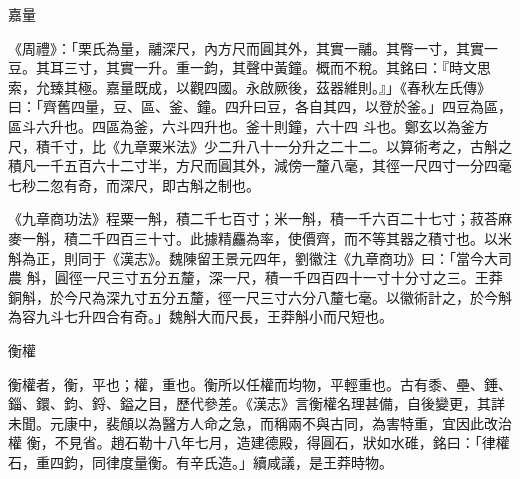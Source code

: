 \begin{pinyinscope}
 嘉量



 《周禮》：「栗氏為量，鬴深尺，內方尺而圓其外，其實一鬴。其臀一寸，其實一豆。其耳三寸，其實一升。重一鈞，其聲中黃鐘。概而不稅。其銘曰：『時文思索，允臻其極。嘉量既成，以觀四國。永啟厥後，茲器維則。』」《春秋左氏傳》曰：「齊舊四量，豆、區、釜、鐘。四升曰豆，各自其四，以登於釜。」四豆為區，區斗六升也。四區為釜，六斗四升也。釜十則鐘，六十四
 斗也。鄭玄以為釜方尺，積千寸，比《九章粟米法》少二升八十一分升之二十二。以算術考之，古斛之積凡一千五百六十二寸半，方尺而圓其外，減傍一釐八毫，其徑一尺四寸一分四毫七秒二忽有奇，而深尺，即古斛之制也。



 《九章商功法》程粟一斛，積二千七百寸；米一斛，積一千六百二十七寸；菽荅麻麥一斛，積二千四百三十寸。此據精麤為率，使價齊，而不等其器之積寸也。以米斛為正，則同于《漢志》。魏陳留王景元四年，劉徽注《九章商功》曰：「當今大司農
 斛，圓徑一尺三寸五分五釐，深一尺，積一千四百四十一寸十分寸之三。王莽銅斛，於今尺為深九寸五分五釐，徑一尺三寸六分八釐七毫。以徽術計之，於今斛為容九斗七升四合有奇。」魏斛大而尺長，王莽斛小而尺短也。



 衡權



 衡權者，衡，平也；權，重也。衡所以任權而均物，平輕重也。古有黍、壘、錘、錙、鐶、鈞、鋝、鎰之目，歷代參差。《漢志》言衡權名理甚備，自後變更，其詳未聞。元康中，裴頠以為醫方人命之急，而稱兩不與古同，為害特重，宜因此改治權
 衡，不見省。趙石勒十八年七月，造建德殿，得圓石，狀如水碓，銘曰：「律權石，重四鈞，同律度量衡。有辛氏造。」續咸議，是王莽時物。



\end{pinyinscope}